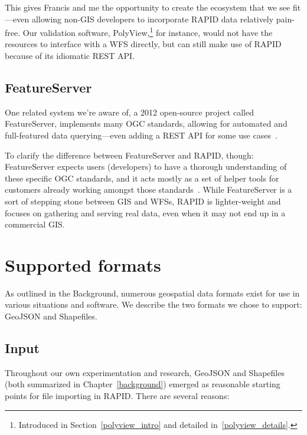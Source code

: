 This gives Francis and me the opportunity to create the ecosystem that we see fit---even allowing non-GIS developers to incorporate RAPID data relatively pain-free. Our validation software, PolyView,\footnote{Introduced in Section~\ref{polyview_intro} and detailed in~\ref{polyview_details}.} for instance, would not have the resources to interface with a WFS directly, but can still make use of RAPID because of its idiomatic REST API.

\subsection{FeatureServer}

One related system we're aware of, a 2012 open-source project called FeatureServer, implements many OGC standards, allowing for automated and full-featured data querying---even adding a REST API for some use cases~\cite{FeatureServ}.

To clarify the difference between FeatureServer and RAPID, though: FeatureServer expects users (developers) to have a thorough understanding of these specific OGC standards, and it acts mostly as a set of helper tools for customers already working amongst those standards~\cite{FeatureServ}. While FeatureServer is a sort of stepping stone between GIS and WFSs, RAPID is lighter-weight and focuses on gathering and serving real data, even when it may not end up in a commercial GIS.

\section{Supported formats}
As outlined in the Background, numerous geospatial data formats exist for use in various situations and software. We describe the two formats we chose to support: GeoJSON and Shapefiles.

\subsection{Input}

Throughout our own experimentation and research, GeoJSON and Shapefiles (both summarized in Chapter~\ref{background}) emerged as reasonable starting points for file importing in RAPID. There are several reasons:

